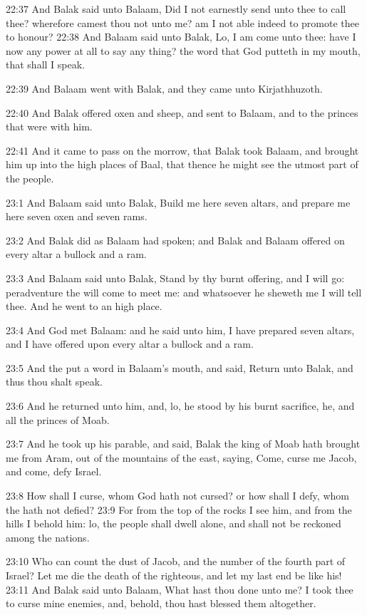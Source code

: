 22:37 And Balak said unto Balaam, Did I not earnestly send unto thee to call thee? wherefore camest thou not unto me? am I not able indeed to promote thee to honour?  22:38 And Balaam said unto Balak, Lo, I am come unto thee: have I now any power at all to say any thing? the word that God putteth in my mouth, that shall I speak.

22:39 And Balaam went with Balak, and they came unto Kirjathhuzoth.

22:40 And Balak offered oxen and sheep, and sent to Balaam, and to the princes that were with him.

22:41 And it came to pass on the morrow, that Balak took Balaam, and brought him up into the high places of Baal, that thence he might see the utmost part of the people.

23:1 And Balaam said unto Balak, Build me here seven altars, and prepare me here seven oxen and seven rams.

23:2 And Balak did as Balaam had spoken; and Balak and Balaam offered on every altar a bullock and a ram.

23:3 And Balaam said unto Balak, Stand by thy burnt offering, and I will go: peradventure the \LORD will come to meet me: and whatsoever he sheweth me I will tell thee. And he went to an high place.

23:4 And God met Balaam: and he said unto him, I have prepared seven altars, and I have offered upon every altar a bullock and a ram.

23:5 And the \LORD put a word in Balaam's mouth, and said, Return unto Balak, and thus thou shalt speak.

23:6 And he returned unto him, and, lo, he stood by his burnt sacrifice, he, and all the princes of Moab.

23:7 And he took up his parable, and said, Balak the king of Moab hath brought me from Aram, out of the mountains of the east, saying, Come, curse me Jacob, and come, defy Israel.

23:8 How shall I curse, whom God hath not cursed? or how shall I defy, whom the \LORD hath not defied?  23:9 For from the top of the rocks I see him, and from the hills I behold him: lo, the people shall dwell alone, and shall not be reckoned among the nations.

23:10 Who can count the dust of Jacob, and the number of the fourth part of Israel? Let me die the death of the righteous, and let my last end be like his!  23:11 And Balak said unto Balaam, What hast thou done unto me? I took thee to curse mine enemies, and, behold, thou hast blessed them altogether.

